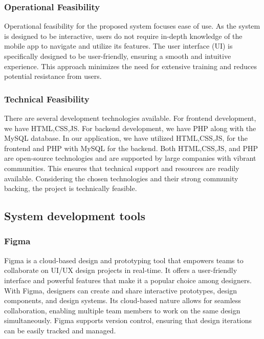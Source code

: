 \documentclass{article}
\begin{document}
\subsubsection{Operational Feasibility}
Operational feasibility for the proposed system focuses ease of use. As the system is designed to be interactive, users do not require in-depth knowledge of the mobile app to navigate and utilize its features. The user interface (UI) is specifically designed to be user-friendly, ensuring a smooth and intuitive experience. This approach minimizes the need for extensive training and reduces potential resistance from users.  
\subsubsection{Technical Feasibility}
There are several development technologies available. For frontend development, we have HTML,CSS,JS. For backend development, we have PHP along with the MySQL database. In our application, we have utilized HTML,CSS,JS, for the frontend and PHP with MySQL for the backend. Both HTML,CSS,JS, and PHP are open-source technologies and are supported by large companies with vibrant communities. This ensures that technical support and resources are readily available. Considering the chosen technologies and their strong community backing, the project is technically feasible.
\subsection{System development tools}
\subsubsection{Figma}
Figma is a cloud-based design and prototyping tool that empowers teams to collaborate on UI/UX design projects in real-time. It offers a user-friendly interface and powerful features that make it a popular choice among designers. With Figma, designers can create and share interactive prototypes, design components, and design systems. Its cloud-based nature allows for seamless collaboration, enabling multiple team members to work on the same design simultaneously. Figma supports version control, ensuring that design iterations can be easily tracked and managed. 
\end{document}
